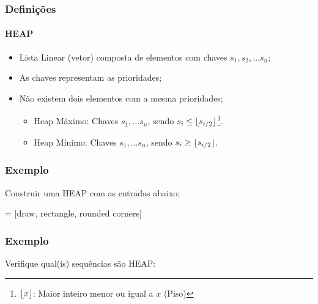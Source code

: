 \documentclass[10pt]{beamer}
\begin{document}
\DeclarePairedDelimiter\floor{\lfloor}{\rfloor}
\begin{frame}
    \frametitle{Definições}
    \framesubtitle{HEAP}
    \begin{itemize}[<+-|alert@+>]
        \large\setlength{\itemsep}{1em}
        \color{cinza}
        \item Lista Linear (vetor) composta de elementos com chaves $s_1, s_2, \ldots s_n$;
        \item As chaves representam as prioridades;
        \item Não existem dois elementos com a mesma prioridades;\vspace*{1em}
              \begin{itemize}\setlength{\itemsep}{1em}
                  \large
                  \item Heap Máximo: Chaves $s_1, \ldots s_n$, sendo $s_i \leq \floor{s_{i/2}}$\footnote{$\floor{x}$: Maior inteiro menor ou igual a $x$ (Piso)}.
                  \item Heap Mínimo: Chaves $s_1, \ldots s_n$, sendo $s_i \geq \floor{ s_{i/2}}$.
              \end{itemize}
    \end{itemize}
\end{frame}

\begin{frame}[t]
    \frametitle{Exemplo}
    \large
    Construir uma HEAP com as entradas abaixo:

    \center
     = [draw, rectangle, rounded corners]
    \vfill
\end{frame}

\begin{frame}[t]
    \frametitle{Exemplo}
    \Large
    Verifique qual(is) sequências são HEAP:\vfill

    \center
    \vfill
\end{frame}
\end{document}

